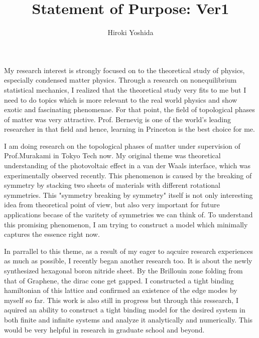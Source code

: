 \documentclass[a4]{article}
\title{Statement of Purpose: Ver1}
\author{Hiroki Yoshida}
\date{}
\begin{document}
\maketitle

My research interest is strongly focused on to the theoretical study of physics, especially condensed matter physics. Through a research on nonequilibrium statistical mechanics, I realized that the theoretical study very fits to me but I need to do topics which is more relevant to the real world physics and show exotic and fascinating phenomenae. For that point, the field of topological phases of matter was very attractive. Prof. Bernevig is one of the world's leading researcher in that field and hence, learning in Princeton is the best choice for me.\par


I am doing research on the topological phases of matter under supervision of Prof.Murakami in Tokyo Tech now. My original theme was theoretical understanding of the photovoltaic effect in a van der Waals interface, which was experimentally observed recently. This phenomenon is caused by the breaking of symmetry by stacking two sheets of materials with different rotational symmetries. This "symmetry breaking by symmetry" itself is not only interesting idea from theoretical point of view, but also very important for future applications becase of the varitety of symmetries we can think of. To understand this promising phenomenon, I am trying to construct a model which minimally captures the essence right now. \par

In parrallel to this theme, as a result of my eager to aqcuire research experiences as much as possible, I recently began another research too. It is about the newly synthesized hexagonal boron nitride sheet. By the Brillouin zone folding from that of Graphene, the dirac cone get gapped. I constructed a tight binding hamiltonian of this lattice and confirmed an existence of the edge modes by myself so far. This work is also still in progress but through this ressearch, I aquired an ability to construct a tight binding model for the desired system in both finite and infinite systems and analyze it analytically and numerically. This would be very helpful in research in graduate school and beyond.\par
\end{document}
